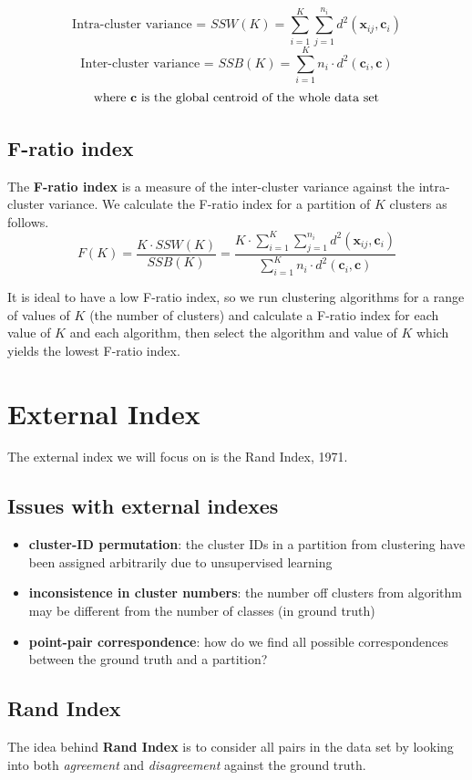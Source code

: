 \documentclass[11pt,fleqn]{book} %
\begin{document}
$$ \text{Intra-cluster variance = } SSW(K) = \sum^K_{i=1}\sum^{n_i}_{j=1}d^2(\mathbf{x}_{ij}, \mathbf{c}_i)$$
$$ \text{Inter-cluster variance = } SSB(K) = \sum^K_{i=1}n_i \cdot d^2(\mathbf{c}_i, \mathbf{c})$$
$$ \text{where \textbf{c} is the global centroid of the whole data set} $$

\subsection{F-ratio index}
The \textbf{F-ratio index} is a measure of the inter-cluster variance against the intra-cluster variance. We calculate the F-ratio index for a partition of $K$ clusters as follows.
$$ F(K) = \frac{K \cdot SSW(K)}{SSB(K)} = \frac{K \cdot \sum^K_{i=1}\sum^{n_i}_{j=1}d^2(\mathbf{x}_{ij}, \mathbf{c}_i)}{\sum^K_{i=1}n_i \cdot d^2(\mathbf{c}_i, \mathbf{c})}$$

\noindent
It is ideal to have a low F-ratio index, so we run clustering algorithms for a range of values of $K$ (the number of clusters) and calculate a F-ratio index for each value of $K$ and each algorithm, then select the algorithm and value of $K$ which yields the lowest F-ratio index.

\section{External Index}
The external index we will focus on is the Rand Index, 1971.

\subsection{Issues with external indexes}
\begin{itemize}
	\item \textbf{cluster-ID permutation}: the cluster IDs in a partition from clustering have been assigned arbitrarily due to unsupervised learning
	\item \textbf{inconsistence in cluster numbers}: the number off clusters from algorithm may be different from the number of classes (in ground truth)
	\item \textbf{point-pair correspondence}: how do we find all possible correspondences between the ground truth and a partition?
\end{itemize}

\subsection{Rand Index}
The idea behind \textbf{Rand Index} is to consider all pairs in the data set by looking into both \textit{agreement} and \textit{disagreement} against the ground truth.
\end{document}
